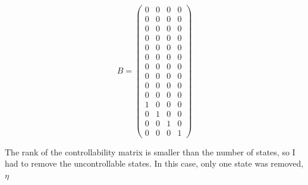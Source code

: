 \documentclass{beamer}
\begin{document}
\begin{frame}
    \begin{equation*}
        B = \left(\begin{array}{cccc} 0 & 0 & 0 & 0\\ 0 & 0 & 0 & 0\\ 0 & 0 & 0 & 0\\ 0 & 0 & 0 & 0\\ 0 & 0 & 0 & 0\\ 0 & 0 & 0 & 0\\ 0 & 0 & 0 & 0\\ 0 & 0 & 0 & 0\\ 0 & 0 & 0 & 0\\ 0 & 0 & 0 & 0\\ 1 & 0 & 0 & 0\\ 0 & 1 & 0 & 0\\ 0 & 0 & 1 & 0\\ 0 & 0 & 0 & 1 \end{array}\right)
    \end{equation*}
\end{frame}

\begin{frame}
    The rank of the controllability matrix is smaller than the number of states, so I had to remove the uncontrollable states. In this case, only one state was removed, $\eta$

\end{frame}
\end{document}

